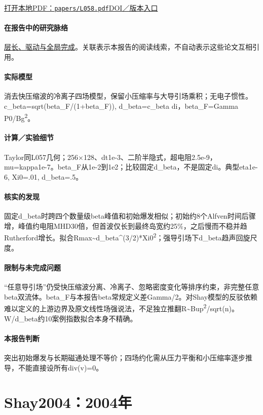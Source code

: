 \href{run:papers/L058.pdf}{打开本地PDF：\texttt{papers/L058.pdf}}\quad\href{https://doi.org/10.1063/1.1768956}{DOI／版本入口}

\paragraph{在报告中的研究脉络}\hyperref[story:global]{层长、驱动与全局完成}。关联表示本报告的阅读线索，不自动表示这些论文互相引用。

\paragraph{实际模型}消去快压缩波的冷离子四场模型，保留小压缩率与大导引场乘积；无电子惯性。c\_beta=sqrt(beta\_F/(1+beta\_F)), d\_beta=c\_beta di，beta\_F=Gamma P0/Bg\textsuperscript{2}。

\paragraph{计算／实验细节}Taylor同L057几何；256×128、dt1e-3、二阶半隐式，超电阻2.5e-9，mu=kappa1e-7。beta\_F从1e-2到1e2；比较固定d\_beta，不是固定di。典型eta1e-6, Xi0=.01, d\_beta=.5。

\paragraph{核实的发现}固定d\_beta时跨四个数量级beta峰值和初始爆发相似；初始约8个Alfven时间后骤增，峰值约电阻MHD30倍，但首波仅长到最终岛宽约25\%，之后慢而不稳并趋Rutherford增长。拟合Rmax\textasciitilde{}d\_beta\textasciicircum{}(3/2)*Xi0\textsuperscript{2}；强导引场下d\_beta趋声回旋尺度。

\paragraph{限制与未完成问题}“任意导引场”仍受快压缩波分离、冷离子、忽略密度变化等排序约束，非完整任意beta双流体。beta\_F与本报告beta常规定义差Gamma/2。对Shay模型的反驳依赖难以定义的上游边界及原文线性场强说法，不足独立推翻R\textasciitilde{}Bup\textsuperscript{2}/sqrt(n)。W/d\_beta约10案例指数拟合本身不精确。

\paragraph{本报告判断}突出初始爆发与长期磁通处理不等价；四场约化需从压力平衡和小压缩率逐步推导，不能直接设所有div(v)=0。

\section{Shay2004：2004年}\label{paper:Shay2004}

